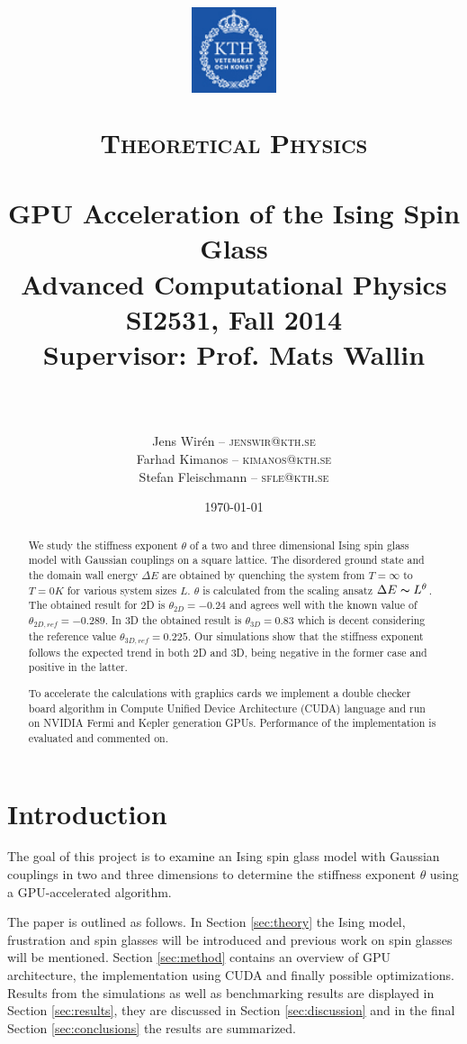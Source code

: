 \documentclass[paper=a4, fontsize=11pt]{scrartcl} %
\title{
\vspace{-2.5cm}
\begin{center}
\includegraphics[width=2.5cm]{logo-kth.png}\\[-1mm]
\hspace{-3mm}
\end{center}
\normalfont \normalsize
\textsc{Theoretical Physics} \\ [25pt] %
\horrule{0.5pt} \\[0.4cm] %
\huge GPU Acceleration of the Ising Spin Glass \\ %
\Large Advanced Computational Physics\\ %
\Large SI2531, Fall 2014\\ %
\Large Supervisor: Prof. Mats Wallin \\ %
\horrule{2pt} \\[0.5cm] %
}
\author{Jens Wir\'{e}n \--- \small \textsc{jenswir@kth.se} \\
Farhad Kimanos \small \--- \textsc{kimanos@kth.se} \\
Stefan Fleischmann \--- \small \textsc{sfle@kth.se} \\
} %
\date{\normalsize\today} %
\numberwithin{equation}{section} %
\numberwithin{figure}{section} %
\numberwithin{table}{section} %
\begin{document}
\maketitle %


\begin{abstract}
We study the stiffness exponent $\theta$ of a two and three dimensional Ising spin glass model with Gaussian couplings on a square lattice. The disordered ground state and the domain wall energy $\Delta E$ are obtained by quenching the system from $T=\infty$ to $T=0 K$ for various system sizes $L$. $\theta$ is calculated from the scaling ansatz $\Delta E \thicksim L^\theta$. The obtained result for 2D is $\theta_{2D}=-0.24$ and agrees well with the known value of $\theta_{2D,ref}=-0.289$. In 3D the obtained result is $\theta_{3D}=0.83$ which is decent considering the reference value $\theta_{3D,ref}=0.225$. Our simulations show that the stiffness exponent follows the expected trend in both 2D and 3D, being negative in the former case and positive in the latter.

To accelerate the calculations with graphics cards we implement a double checker board algorithm in Compute Unified Device Architecture (CUDA) language and run on NVIDIA Fermi and Kepler generation GPUs. Performance of the implementation is evaluated and commented on. 
\end{abstract}

\pagebreak

\tableofcontents

\pagebreak

\section{Introduction}

The goal of this project is to examine an Ising spin glass model with Gaussian couplings in two and three dimensions to determine the stiffness exponent $\theta$ using a GPU-accelerated algorithm.

The paper is outlined as follows. In Section \ref{sec:theory} the Ising model, frustration and spin glasses will be introduced and previous work on spin glasses will be mentioned. Section \ref{sec:method} contains an overview of GPU architecture, the implementation using CUDA and finally possible optimizations. Results from the simulations as well as benchmarking results are displayed in Section \ref{sec:results}, they are discussed in Section \ref{sec:discussion} and in the final Section \ref{sec:conclusions} the results are summarized.
\end{document}
